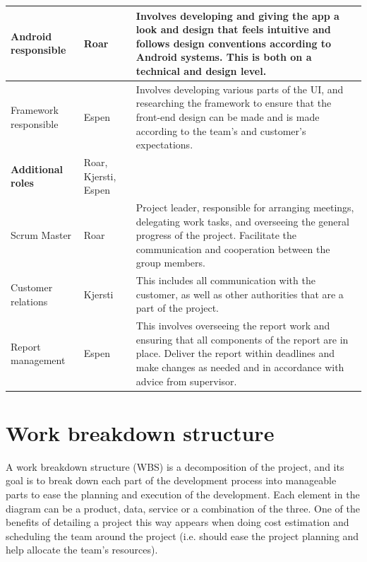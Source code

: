 \begin{table}[!h]
\begin{tabular}{ | p{2.5cm} | p{2.8cm} | p{12cm} |}
			Android responsible & Roar & Involves developing and giving the app a look and design that feels intuitive and follows design conventions according to Android systems. This is both on a  technical and design level. \\ \hline
			
			Framework responsible & Espen & Involves developing various parts of the UI, and researching the framework to ensure that the front-end design can be made and is made according to the team's and customer's expectations. \\ \hline
			
			\textbf{Additional roles} & Roar, Kjersti, Espen & \\ \hline
			
			Scrum Master & Roar & Project leader, responsible for arranging meetings, delegating work tasks, and overseeing the general progress of the project. Facilitate the communication and cooperation between the group members. \\ \hline
			
			Customer relations & Kjersti & This includes all communication with the customer, as well as other authorities that are a part of the project. \\ \hline
			
			Report management & Espen & This involves overseeing the report work and ensuring that all components of the report are in place. Deliver the report within deadlines and make changes as needed and in accordance with advice from supervisor. \\ \hline
		\end{tabular}
	\label{Tab:roles}
\end{table}

\section{Work breakdown structure}

A work breakdown structure (WBS) is a decomposition of the project, and its goal is to break down each part of the development process into manageable parts to ease the planning and execution of the development. Each element in the diagram can be a product, data, service or a combination of the three. One of the benefits of detailing a project this way appears when doing cost estimation and scheduling the team around the project (i.e. should ease the project planning and help allocate the team's resources).\newline

